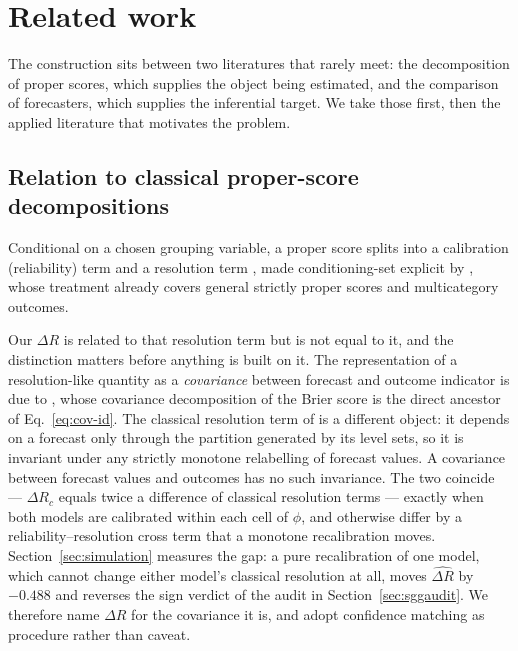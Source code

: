 \section{Related work}\label{sec:related}

The construction sits between two literatures that rarely meet: the decomposition of
proper scores, which supplies the object being estimated, and the comparison of
forecasters, which supplies the inferential target. We take those first, then the applied
literature that motivates the problem.

\subsection{Relation to classical proper-score decompositions}\label{sec:related-decomposition}

Conditional on a chosen grouping variable, a proper score splits into a calibration
(reliability) term and a resolution term \citep{murphy1973vector,degroot1983comparison}, made
conditioning-set explicit by \citet{brocker2009reliability}, whose treatment already covers
general strictly proper scores and multicategory outcomes.

Our $\Delta R$ is related to that resolution term but is not equal to it, and the distinction
matters before anything is built on it. The representation of a resolution-like quantity as a
\emph{covariance} between forecast and outcome indicator is due to \citet{yates1982external},
whose covariance decomposition of the Brier score is the direct ancestor of
Eq.~\eqref{eq:cov-id}. The classical resolution term of \citet{degroot1983comparison} is a
different object: it depends on a forecast only through the partition generated by its level
sets, so it is invariant under any strictly monotone relabelling of forecast values. A
covariance between forecast values and outcomes has no such invariance. The two coincide ---
$\Delta R_c$ equals twice a difference of classical resolution terms --- exactly when both
models are calibrated within each cell of $\phi$, and otherwise differ by a
reliability--resolution cross term that a monotone recalibration moves.
Section~\ref{sec:simulation} measures the gap: a pure recalibration of one model, which
cannot change either model's classical resolution at all, moves $\widehat{\Delta R}$ by
$-0.488$ and reverses the sign verdict of the audit in Section~\ref{sec:sggaudit}. We
therefore name $\Delta R$ for the covariance it is, and adopt confidence matching as
procedure rather than caveat.

